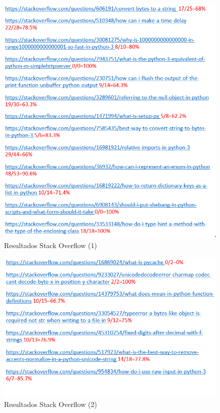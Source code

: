 \documentclass[a4paper, 12pt]{book}
\begin{document}
\begin{figure}
	\centering
    \includegraphics[width=1\textwidth]{img/stack5}
    \caption{Resultados Stack Overflow (1)}
    \label{figura:stack5}
 \end{figure}
 
\begin{figure}
	\centering
    \includegraphics[width=1\textwidth]{img/stack6}
    \caption{Resultados Stack Overflow (2)}
    \label{figura:stack6}
 \end{figure}
 
\end{document}
